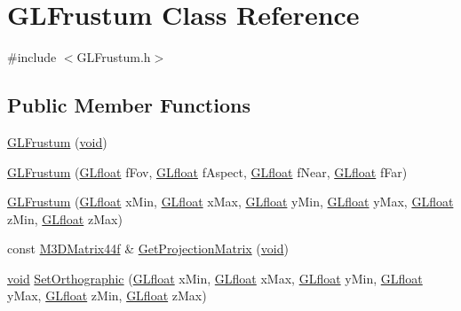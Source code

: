 \hypertarget{class_g_l_frustum}{\section{G\-L\-Frustum Class Reference}
\label{class_g_l_frustum}
}


{\ttfamily \#include $<$G\-L\-Frustum.\-h$>$}

\subsection*{Public Member Functions}
\begin{DoxyCompactItemize}
\item 
\hyperlink{class_g_l_frustum_aac6414de93a47461155ace36f4e09f5c}{G\-L\-Frustum} (\hyperlink{_s_d_l__opengl_8h_a3db05964a3cc4410f35b7ea2b7eb850d}{void})
\item 
\hyperlink{class_g_l_frustum_a6ad3d9d0b6389d2021c54cd8d132292c}{G\-L\-Frustum} (\hyperlink{_g_l_e_w_2glew_8h_a4a966015c733cb5fe2733de64a62a3a5}{G\-Lfloat} f\-Fov, \hyperlink{_g_l_e_w_2glew_8h_a4a966015c733cb5fe2733de64a62a3a5}{G\-Lfloat} f\-Aspect, \hyperlink{_g_l_e_w_2glew_8h_a4a966015c733cb5fe2733de64a62a3a5}{G\-Lfloat} f\-Near, \hyperlink{_g_l_e_w_2glew_8h_a4a966015c733cb5fe2733de64a62a3a5}{G\-Lfloat} f\-Far)
\item 
\hyperlink{class_g_l_frustum_ab3b57b1a40c0bed32d8767b95dde4964}{G\-L\-Frustum} (\hyperlink{_g_l_e_w_2glew_8h_a4a966015c733cb5fe2733de64a62a3a5}{G\-Lfloat} x\-Min, \hyperlink{_g_l_e_w_2glew_8h_a4a966015c733cb5fe2733de64a62a3a5}{G\-Lfloat} x\-Max, \hyperlink{_g_l_e_w_2glew_8h_a4a966015c733cb5fe2733de64a62a3a5}{G\-Lfloat} y\-Min, \hyperlink{_g_l_e_w_2glew_8h_a4a966015c733cb5fe2733de64a62a3a5}{G\-Lfloat} y\-Max, \hyperlink{_g_l_e_w_2glew_8h_a4a966015c733cb5fe2733de64a62a3a5}{G\-Lfloat} z\-Min, \hyperlink{_g_l_e_w_2glew_8h_a4a966015c733cb5fe2733de64a62a3a5}{G\-Lfloat} z\-Max)
\item 
const \hyperlink{math3d_8h_a1e8690467d81d5ed97c5ecc3a144a4ac}{M3\-D\-Matrix44f} \& \hyperlink{class_g_l_frustum_aec9e810a180aabe90c1fb270081e9bc6}{Get\-Projection\-Matrix} (\hyperlink{_s_d_l__opengl_8h_a3db05964a3cc4410f35b7ea2b7eb850d}{void})
\item 
\hyperlink{_s_d_l__opengl_8h_a3db05964a3cc4410f35b7ea2b7eb850d}{void} \hyperlink{class_g_l_frustum_a0451625ea68e3207c505abfb9e9877b5}{Set\-Orthographic} (\hyperlink{_g_l_e_w_2glew_8h_a4a966015c733cb5fe2733de64a62a3a5}{G\-Lfloat} x\-Min, \hyperlink{_g_l_e_w_2glew_8h_a4a966015c733cb5fe2733de64a62a3a5}{G\-Lfloat} x\-Max, \hyperlink{_g_l_e_w_2glew_8h_a4a966015c733cb5fe2733de64a62a3a5}{G\-Lfloat} y\-Min, \hyperlink{_g_l_e_w_2glew_8h_a4a966015c733cb5fe2733de64a62a3a5}{G\-Lfloat} y\-Max, \hyperlink{_g_l_e_w_2glew_8h_a4a966015c733cb5fe2733de64a62a3a5}{G\-Lfloat} z\-Min, \hyperlink{_g_l_e_w_2glew_8h_a4a966015c733cb5fe2733de64a62a3a5}{G\-Lfloat} z\-Max)

\end{DoxyCompactItemize}
